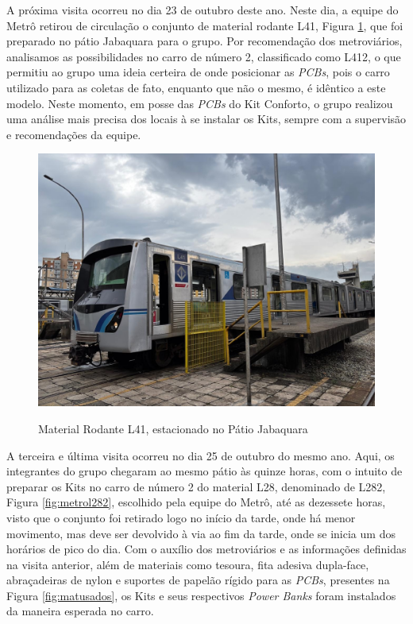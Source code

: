 \documentclass[acronym,symbols,table]{fei}
\begin{document}
A próxima visita ocorreu no dia 23 de outubro deste ano. Neste dia, a equipe do Metrô retirou de circulação o conjunto de material rodante L41, Figura \ref{fig:metrol41}, que foi preparado no pátio Jabaquara para o grupo. Por recomendação dos metroviários, analisamos as possibilidades no carro de número 2, classificado como L412, o que permitiu ao grupo uma ideia certeira de onde posicionar as \textit{PCBs}, pois o carro utilizado para as coletas de fato, enquanto que não o mesmo, é idêntico a este modelo. Neste momento, em posse das \textit{PCBs} do Kit Conforto, o grupo realizou uma análise mais precisa dos locais à se instalar os Kits, sempre com a supervisão e recomendações da equipe.

\begin{figure}[!htb]
\centering
    \caption{Material Rodante L41, estacionado no Pátio Jabaquara}
    \includegraphics[width=0.60\linewidth]{Imagens/metrol41.jpg}
    \label{fig:metrol41}
\end{figure}

A terceira e última visita ocorreu no dia 25 de outubro do mesmo ano. Aqui, os integrantes do grupo chegaram ao mesmo pátio às quinze horas, com o intuito de preparar os Kits no carro de número 2 do material L28, denominado de L282, Figura \ref{fig:metrol282}, escolhido pela equipe do Metrô, até as dezessete horas, visto que o conjunto foi retirado logo no início da tarde, onde há menor movimento, mas deve ser devolvido à via ao fim da tarde, onde se inicia um dos horários de pico do dia. Com o auxílio dos metroviários e as informações definidas na visita anterior, além de materiais como tesoura, fita adesiva dupla-face, abraçadeiras de nylon e suportes de papelão rígido para as \textit{PCBs}, presentes na Figura \ref{fig:matusados}, os Kits e seus respectivos \textit{Power Banks} foram instalados da maneira esperada no carro. 
\end{document}
